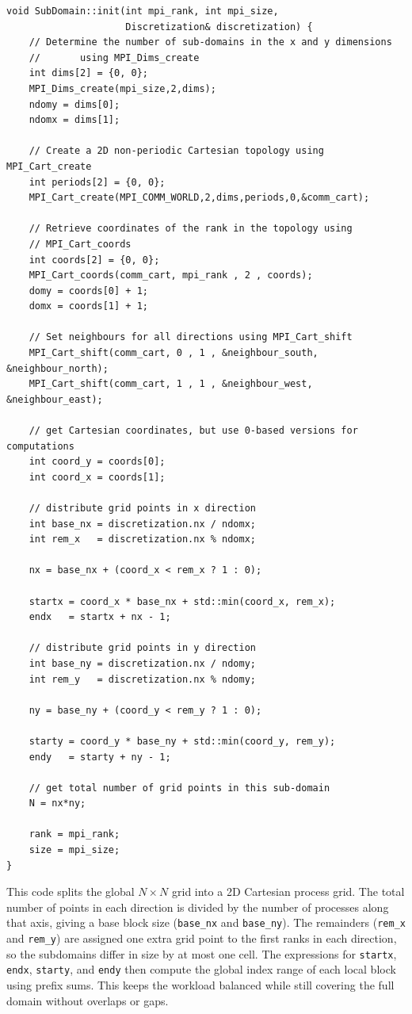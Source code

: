 \documentclass[unicode,10pt,a4paper,oneside,numbers=endperiod,openany]{scrartcl}
\begin{document}
\begin{lstlisting}[style=grayverbatim,label={lst:subdomain_init},caption={Initialization of the sub-domain}]
void SubDomain::init(int mpi_rank, int mpi_size,
                     Discretization& discretization) {
    // Determine the number of sub-domains in the x and y dimensions
    //       using MPI_Dims_create
    int dims[2] = {0, 0};
    MPI_Dims_create(mpi_size,2,dims);
    ndomy = dims[0];
    ndomx = dims[1];

    // Create a 2D non-periodic Cartesian topology using MPI_Cart_create
    int periods[2] = {0, 0};
    MPI_Cart_create(MPI_COMM_WORLD,2,dims,periods,0,&comm_cart);

    // Retrieve coordinates of the rank in the topology using
    // MPI_Cart_coords
    int coords[2] = {0, 0};
    MPI_Cart_coords(comm_cart, mpi_rank , 2 , coords);
    domy = coords[0] + 1;
    domx = coords[1] + 1;

    // Set neighbours for all directions using MPI_Cart_shift
    MPI_Cart_shift(comm_cart, 0 , 1 , &neighbour_south, &neighbour_north);
    MPI_Cart_shift(comm_cart, 1 , 1 , &neighbour_west, &neighbour_east);

    // get Cartesian coordinates, but use 0-based versions for computations
    int coord_y = coords[0];
    int coord_x = coords[1];

    // distribute grid points in x direction
    int base_nx = discretization.nx / ndomx;
    int rem_x   = discretization.nx % ndomx;

    nx = base_nx + (coord_x < rem_x ? 1 : 0);

    startx = coord_x * base_nx + std::min(coord_x, rem_x);
    endx   = startx + nx - 1;

    // distribute grid points in y direction
    int base_ny = discretization.nx / ndomy;
    int rem_y   = discretization.nx % ndomy;

    ny = base_ny + (coord_y < rem_y ? 1 : 0);

    starty = coord_y * base_ny + std::min(coord_y, rem_y);
    endy   = starty + ny - 1;

    // get total number of grid points in this sub-domain
    N = nx*ny;

    rank = mpi_rank;
    size = mpi_size;
}
\end{lstlisting}
This code splits the global $N \times N$ grid into a 2D Cartesian process grid. The total number of points in each direction is divided by the number of processes along that axis, giving a base block size (\texttt{base\_nx} and \texttt{base\_ny}). The remainders (\texttt{rem\_x} and \texttt{rem\_y}) are assigned one extra grid point to the first ranks in each direction, so the subdomains differ in size by at most one cell. The expressions for \texttt{startx}, \texttt{endx}, \texttt{starty}, and \texttt{endy} then compute the global index range of each local block using prefix sums. This keeps the workload balanced while still covering the full domain without overlaps or gaps.
\end{document}
